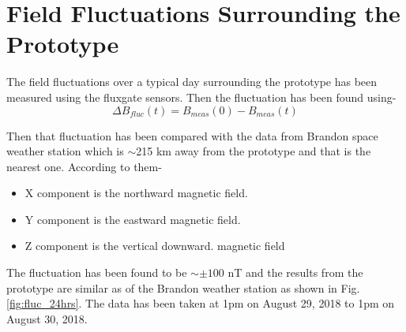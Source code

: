 








\section{Field Fluctuations Surrounding the Prototype}\label{sec:field}

The field fluctuations over a typical day surrounding the prototype has been measured using the fluxgate sensors. Then the fluctuation has been found using-
\begin{equation}
    \Delta B_{fluc}(t) = B_{meas}(0) - B_{meas}(t)
\end{equation}

Then that fluctuation has been compared with the data from Brandon space weather station \cite{weather_station} which is $\sim$215 km away from the prototype and that is the nearest one. According to them-
\begin{itemize}
    \item X component is the northward magnetic field.
    \item Y component is the eastward magnetic field.
    \item Z component is the vertical downward. magnetic field
\end{itemize}
The fluctuation has been found to be $\sim \pm 100$ nT and the results from the prototype are similar as of the Brandon weather station as shown in Fig. \ref{fig:fluc_24hrs}. The data has been taken at 1pm on August 29, 2018 to 1pm on August 30, 2018.







